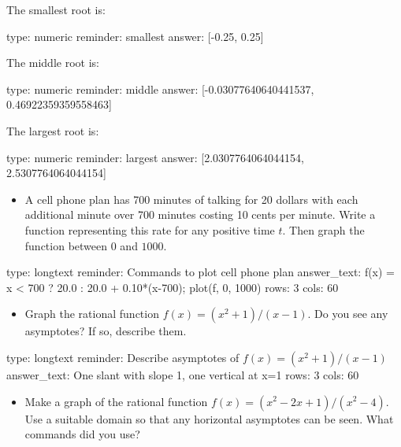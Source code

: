 \documentclass[12pt]{article}
\begin{document}
The smallest root is:

\begin{answer}
    type: numeric
    reminder: smallest
    answer: [-0.25, 0.25]

\end{answer}

The middle root is:

\begin{answer}
    type: numeric
    reminder: middle
    answer: [-0.03077640640441537, 0.46922359359558463]

\end{answer}

The largest root is:

\begin{answer}
    type: numeric
    reminder: largest
    answer: [2.0307764064044154, 2.5307764064044154]

\end{answer}

\begin{itemize}
\itemsep1pt\parskip0pt
\item
  A cell phone plan has 700 minutes of talking for 20 dollars with each
  additional minute over 700 minutes costing 10 cents per minute. Write
  a function representing this rate for any positive time $t$. Then
  graph the function between $0$ and $1000$.
\end{itemize}

\begin{answer}
type: longtext
reminder: Commands to plot cell phone plan
answer_text: f(x) = x < 700 ? 20.0  : 20.0 + 0.10*(x-700); plot(f, 0, 1000) 
rows: 3
cols: 60
\end{answer}

\begin{itemize}
\itemsep1pt\parskip0pt
\item
  Graph the rational function $f(x) = (x^2 + 1)/ (x - 1)$. Do you see
  any asymptotes? If so, describe them.
\end{itemize}

\begin{answer}
type: longtext
reminder: Describe asymptotes of \(f(x) = (x^2 + 1)/ (x - 1) \)
answer_text: One slant with slope 1, one vertical at x=1 
rows: 3
cols: 60
\end{answer}

\begin{itemize}
\itemsep1pt\parskip0pt
\item
  Make a graph of the rational function
  $f(x) = (x^2 - 2x + 1)/(x^2 -   4)$. Use a suitable domain so that any
  horizontal asymptotes can be seen. What commands did you use?
\end{itemize}
\end{document}
